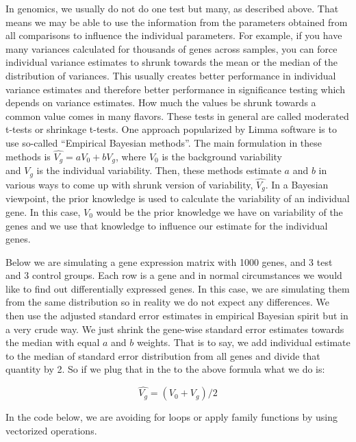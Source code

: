 \documentclass[12pt,]{krantz}
\begin{document}
In genomics, we usually do not do one test but many, as described above. That means we
may be able to use the information from the parameters obtained from all
comparisons to influence the individual parameters. For example, if you have many variances
calculated for thousands of genes across samples, you can force individual
variance estimates to shrunk towards the mean or the median of the distribution
of variances. This usually creates better performance in individual variance
estimates and therefore better performance in significance testing which
depends on variance estimates. How much the values be shrunk towards a common
value comes in many flavors. These tests in general are called moderated
t-tests or shrinkage t-tests. One approach popularized by Limma software is
to use so-called ``Empirical Bayesian methods''. The main formulation in these
methods is \(\hat{V_g} = aV_0 + bV_g\), where \(V_0\) is the background variability\\
and \(V_g\) is the individual variability. Then, these methods estimate \(a\) and \(b\)
in various ways to come up with shrunk version of variability, \(\hat{V_g}\). In a Bayesian viewpoint,
the prior knowledge is used to calculate the variability of an individual gene. In this
case, \(V_0\) would be the prior knowledge we have on variability of
the genes and we
use that knowledge to influence our estimate for the individual genes.

Below we are simulating a gene expression matrix with 1000 genes, and 3 test
and 3 control groups. Each row is a gene and in normal circumstances we would
like to find out differentially expressed genes. In this case, we are simulating
them from the same distribution so in reality we do not expect any differences.
We then use the adjusted standard error estimates in empirical Bayesian spirit but
in a very crude way. We just shrink the gene-wise standard error estimates towards the median with equal \(a\) and \(b\) weights. That is to say, we add individual estimate to the
median of standard error distribution from all genes and divide that quantity by 2.
So if we plug that in the to the above formula what we do is:

\[ \hat{V_g} = (V_0 + V_g)/2 \]

In the code below, we are avoiding for loops or apply family functions
by using vectorized operations.
\end{document}
